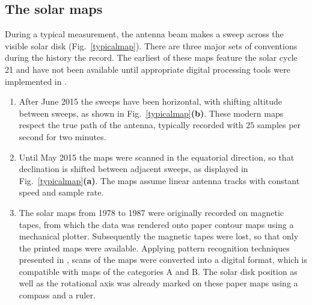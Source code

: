 \documentclass{aa}
\begin{document}
\subsection{The solar maps}\label{sect:source}


  During a typical measurement, the antenna beam makes a sweep across the visible solar disk (Fig.~\ref{typicalmap}). 
  There are three major sets of conventions during the history the record. The earliest of these maps feature the solar 
  cycle 21 and have not been available until appropriate digital processing tools were implemented in \cite{masterthesis}.
  \begin{enumerate}[A]
    \item
    After June 2015 the sweeps have been horizontal, with shifting altitude
    between sweeps, as shown in Fig.~\ref{typicalmap}{\bf(b)}.
    These modern maps respect the true path of the antenna, typically recorded
    with $25$ samples per second for two minutes.
    \item
    Until May 2015 the maps were scanned in the equatorial direction,
    so that declination is shifted between adjacent sweeps, as displayed in
    Fig.~\ref{typicalmap}{\bf(a)}.
    The maps assume linear antenna tracks with constant speed and sample rate.
    \item
    The solar maps from 1978 to 1987 were originally recorded on magnetic
    tapes, from which the data was rendered onto paper contour maps using a
    mechanical plotter.
    Subsequently the magnetic tapes were lost, so that only the printed maps
    were available. Applying pattern recognition techniques presented in \cite{masterthesis}, scans of the maps were converted into
    a digital format, which is compatible with maps of the categories A and B.
    The solar disk position as well as the rotational axis was already marked on these paper maps using a compass and a ruler.
  \end{enumerate}
\end{document}
